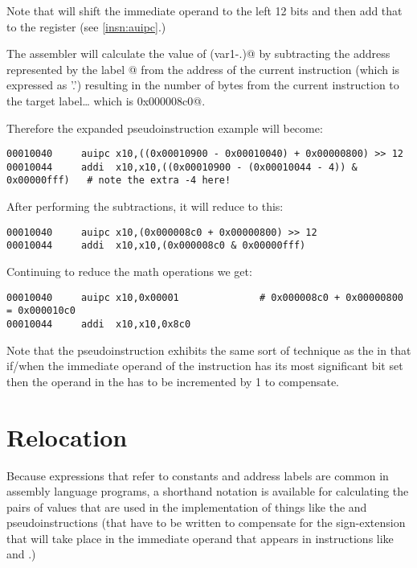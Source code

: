 Note that \verb@auipc@ will shift the immediate operand to the left 12 bits and then
add that to the \verb@pc@ register (see \autoref{insn:auipc}.)

The assembler will calculate the value of \verb@(var1-.)@ by subtracting the address
represented by the label @ from the address of the current instruction 
(which is expressed as '.') resulting in the number of bytes from the current instruction
to the target label\ldots{} which is \verb@0x000008c0@.

Therefore the expanded pseudoinstruction example will become:
{\small
\begin{verbatim}
00010040     auipc x10,((0x00010900 - 0x00010040) + 0x00000800) >> 12
00010044     addi  x10,x10,((0x00010900 - (0x00010044 - 4)) & 0x00000fff)   # note the extra -4 here!
\end{verbatim}
}
After performing the subtractions, it will reduce to this:
{\small
\begin{verbatim}
00010040     auipc x10,(0x000008c0 + 0x00000800) >> 12
00010044     addi  x10,x10,(0x000008c0 & 0x00000fff)
\end{verbatim}
}
Continuing to reduce the math operations we get:
{\small
\begin{verbatim}
00010040     auipc x10,0x00001              # 0x000008c0 + 0x00000800 = 0x000010c0
00010044     addi  x10,x10,0x8c0
\end{verbatim}
}

Note that the \verb@la@ pseudoinstruction exhibits the same sort of technique as 
the \verb@li@ in that
if/when the immediate operand of the \verb@addi@ instruction has its most significant 
bit set then the operand in the \verb@auipc@ has to be incremented by 1 to compensate.








\section{Relocation}
 
Because expressions that refer to constants and address labels are common in 
assembly language programs, a shorthand notation is available for calculating 
the pairs of values that are used in the implementation of things like the 
\verb@li@ and \verb@la@ pseudoinstructions (that have to be written to 
compensate for the sign-extension that will take place in the immediate operand 
that appears in instructions like \verb@addi@ and \verb@jalr@.)

